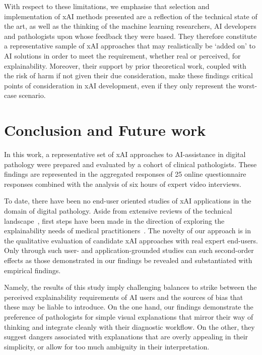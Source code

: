 \documentclass[final,5p,times,twocolumn,hyphens]{elsarticle}
\begin{document}
With respect to these limitations, we emphasise that selection and implementation of xAI methods presented are a reflection of the technical state of the art, as well as the thinking of the machine learning researchers, AI developers and pathologists upon whose feedback they were based. They therefore constitute a representative sample of xAI approaches that may realistically be `added on' to AI solutions in order to meet the requirement, whether real or perceived, for explainability. Moreover, their support by prior theoretical work, coupled with the risk of harm if not given their due consideration, make these findings critical points of consideration in xAI development, even if they only represent the worst-case scenario.

\section{Conclusion and Future work}
\label{sec:FutureWork}

In this work, a representative set of xAI approaches to AI-assistance in digital pathology were prepared and evaluated by a cohort of clinical pathologists. These findings are represented in the aggregated responses of 25 online questionnaire responses combined with the analysis of six hours of expert video interviews. 

To date, there have been no end-user oriented studies of xAI applications in the domain of digital pathology. Aside from extensive reviews of the technical landscape~\cite{yang2021unbox, poceviciute_survey_2020}, first steps have been made in the direction of exploring the explainability needs of medical practitioners~\cite{liao2020questioning,cai2019hello,wang_designing_2019}. The novelty of our approach is in the qualitative evaluation of candidate xAI approaches with real expert end-users. Only through such user- and application-grounded studies can such second-order effects as those demonstrated in our findings be revealed and substantiated with empirical findings.

Namely, the results of this study imply challenging balances to strike between the perceived explainability requirements of AI users and the sources of bias that these may be liable to introduce. On the one hand, our findings demonstrate the preference of pathologists for simple visual explanations that mirror their way of thinking and integrate cleanly with their diagnostic workflow. On the other, they suggest dangers associated with explanations that are overly appealing in their simplicity, or allow for too much ambiguity in their interpretation. 
\end{document}
